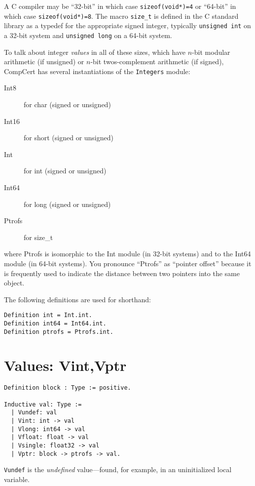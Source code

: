 \documentclass[12pt,fleqn,openany,oneside,showtrims]{memoir}
\begin{document}
A C compiler may be ``32-bit'' in which case
\lstinline{sizeof(void*)=4} or
``64-bit'' in which case
\lstinline{sizeof(void*)=8}.  The macro \lstinline{size_t} is defined
in the C standard library as a typedef for the appropriate signed
integer, typically \lstinline{unsigned int} on a 32-bit system
and \lstinline{unsigned long} on a 64-bit system.

To talk about integer \emph{values} in all of these sizes,
which have $n$-bit modular arithmetic (if unsigned)
or $n$-bit twos-complement arithmetic (if signed),
CompCert has several instantiations of the \lstinline{Integers} module:

\begin{description}
\item[\textsf{Int8}] for char (signed or unsigned)
\item[\textsf{Int16}] for short (signed or unsigned)
\item[\textsf{Int}] for int  (signed or unsigned)
\item[\textsf{Int64}] for long  (signed or unsigned)
\item[\textsf{Ptrofs}] for size\_t
\end{description}
where Ptrofs is isomorphic to the Int module (in 32-bit systems)
and to the Int64 module (in 64-bit systems).  You pronounce
``Ptrofs'' as ``pointer offset'' because it is frequently used to indicate
the distance between two pointers into the same object.

The following definitions are used for shorthand:

\begin{lstlisting}
Definition int = Int.int.
Definition int64 = Int64.int.
Definition ptrofs = Ptrofs.int.
\end{lstlisting}


  
  
  

\chapter{Values: {\upshape\textsf{Vint,Vptr}}}

\begin{lstlisting}
Definition block : Type := positive.

Inductive val: Type :=
  | Vundef: val
  | Vint: int -> val
  | Vlong: int64 -> val
  | Vfloat: float -> val
  | Vsingle: float32 -> val
  | Vptr: block -> ptrofs -> val.
\end{lstlisting}
\lstinline{Vundef} is the \emph{undefined} value---found, for example,
in an uninitialized local variable.
\end{document}

